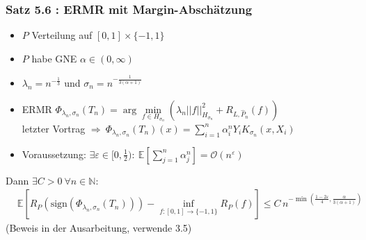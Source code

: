 \documentclass{beamer}
\newcommand{\N}{\mathbb{N}} %
\newcommand{\E}{\mathbb{E}} %
\begin{document}
	\begin{frame}
		\frametitle{Satz 5.6 : ERMR mit Margin-Abschätzung}
		\begin{itemize}
			\item $P$ Verteilung auf $[0,1]\times \{-1,1\}$
			\item $P$ habe GNE $\alpha \in (0,\infty)$
			\item $\lambda_n = n^{-\frac{1}{3}}$ und $\sigma_n = n^{-\frac{1}{3(\alpha+1)}}$
			\item ERMR $\Phi_{\lambda_n, \sigma_n}(T_n) = \arg \min\limits_{f \in H_{\sigma_n}} \left( \lambda_n ||f||_{H_{\sigma_n}}^2 + R_{L,\hat{P}_n}(f) \right)$\\
			letzter Vortrag $\Rightarrow \ \Phi_{\lambda_n, \sigma_n}(T_n)(x) = \sum\limits_{i=1}^n \alpha^n_i Y_i K_{\sigma_n}(x,X_i)$
			\item Voraussetzung: $\exists \varepsilon \in [0,\frac{1}{2}) : \ \E\left[\sum\limits_{j=1}^n \alpha^n_j\right] = \mathcal{O}(n^{\varepsilon})$
		\end{itemize}
		\pause
		Dann $\exists C > 0 \ \forall n \in \N :$
		\begin{align*}
		& \E\left[ R_P(\text{sign}(\Phi_{\lambda_n, \sigma_n}(T_n))) - \inf_{f:[0,1] \rightarrow \{-1,1\}} R_P(f) \right] \leq C\, n^{-\min\left(\frac{1-2\varepsilon}{4}, \frac{\alpha}{3(\alpha+1)}\right)}
		\end{align*}
		(Beweis in der Ausarbeitung, verwende 3.5)
	\end{frame}
	
\end{document}
